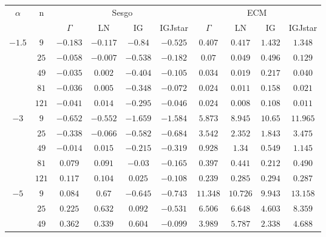 \begin{table}[hbt]										
	\centering									
	\small									
	\begin{tabular}{cc|cccc|cccc}									
		\toprule									
		\multirow{2 }{*}{$\alpha$} &\multirow{2 }{*}{ n  } & \multicolumn{4}{c|}{Sesgo} & \multicolumn{4}{c}{ECM}\\
		\cmidrule(r){3-6}
		\cmidrule(r){7-10}
		&  & $\Gamma$ & LN & IG & IGJstar & $\Gamma$ & LN & IG & IGJstar\\ 
		\midrule				
		\multirow{5 }{*}{$-1.5$} 									
		& $9$	& $-0.183$	& $-0.117$  	& $-0.84$	& $-0.525$	& $0.407$	& $0.417$	& $1.432$ & $1.348$  \\ 
		& $25$ 	& $-0.058$	& $-0.007$	    & $-0.538$	& $-0.182$	& $0.07$	& $0.049$	& $0.496$ & $0.129$ \\ 
		& $49$	& $-0.035$	& $0.002$	    & $-0.404$	& $-0.105$	& $0.034$	& $0.019$	& $0.217$ & $0.040$ \\ 
		& $81$	& $-0.036$	& $0.005$	    & $-0.348$	& $-0.072$	& $0.024$	& $0.011$	& $0.158$ & $0.021$ \\ 
		& $121$	& $-0.041$	& $0.014$	    & $-0.295$	& $-0.046$	& $0.024$	& $0.008$	& $0.108$ & $0.011$ \\ 
		\cmidrule(r){1-6}
		\cmidrule(r){7-10}									
		\multirow{5 }{*}{$-3$}									
		& $9$   & $-0.652$    & $-0.552$	& $-1.659$				& $-1.584$	& $5.873$	& $8.945$	& $10.65$	 		 & $11.965$\\ 
		& $25$	& $-0.338$    & $-0.066$	& $-0.582$				& $-0.684$	& $3.542$	& $2.352$	& \textbf{$1.843$}	 & $3.475$ \\ 
		& $49$	& $-0.014$    & $0.015$  	& $-0.215$				& $-0.319$	& $0.928$	& $1.34$	& \textbf{$0.549$}	 & $1.145$ \\ 
		& $81$	& $0.079$	  & $0.091$	    & \textbf{$-0.03$}	    & $-0.165$	& $0.397$	& $0.441$	& \textbf{$0.212$}	 & $0.490$ \\ 
		& $121$	& $0.117$	  & $0.104$	    & \textbf{$0.025$}	    & $-0.108$	& $0.239$	& $0.285$	& $0.294$	 		 & $0.287$ \\ 
		\cmidrule(r){1-6}
		\cmidrule(r){7-10}									
		\multirow{5 }{*}{$-5$}									
		& $9$	& $0.084$	& $0.67$	& \textbf{$-0.645$}      & $-0.743$			    & $11.348$		& $10.726$  	& \textbf{$9.943$}	 & $13.158$ \\ 
		& $25$	& $0.225$	& $0.632$	& \textbf{$0.092$}	     & $-0.531$			    & $6.506$	    & $6.648$		& \textbf{$4.603$}	 & $8.359$ \\ 
		& $49$	& $0.36$2	& $0.339$	& $0.604$	 			 & \textbf{$-0.099$}	& $3.989$	    & $5.787$	    & \textbf{$2.338$}	 & $4.688$ \\ 

\end{tabular}
\end{table}
